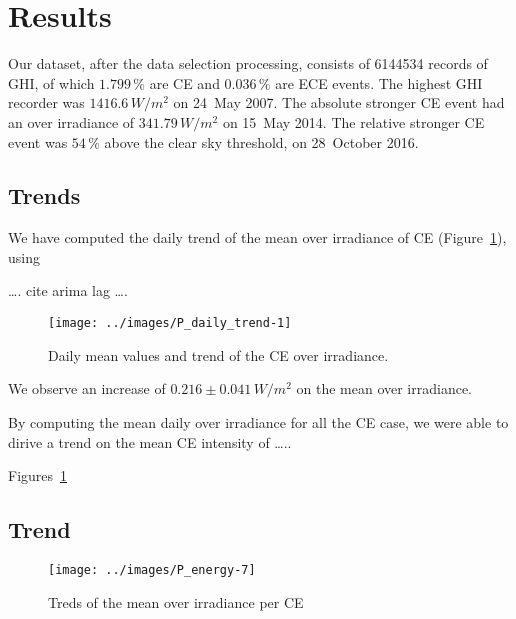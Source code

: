 \documentclass[
]{article}
\begin{document}
\FloatBarrier

\hypertarget{results}{%
\section{Results}\label{results}}

Our dataset, after the data selection processing, consists of
6144534 records of GHI, of which
\(1.799\,\%\) are CE and
\(0.036\,\%\) are ECE events.
The highest GHI recorder was
\(1416.6\,W/m^2\)
on 24~May 2007.
The absolute stronger CE event had an over irradiance of
\(341.79\,W/m^2\) on
15~May 2014.
The relative stronger CE event was
\(54\,\%\) above the
clear sky threshold, on
28~October 2016.

\hypertarget{trends}{%
\subsection{Trends}\label{trends}}

We have computed the daily trend of the mean over irradiance of CE (Figure~\ref{fig:CEmeanDaily}), using

\ldots. cite arima lag \ldots.

\begin{figure}[h!]

{\centering \texttt{[image: ../images/P\_daily\_trend-1]} 

}

\caption{Daily mean values and trend of the CE over irradiance.}\label{fig:CEmeanDaily}
\end{figure}

We observe an increase of
\(0.216\pm 0.041\,W/m^2\)
on the mean over irradiance.

By computing the mean daily over irradiance for all the CE case, we were able to dirive a trend on the mean CE intensity of \ldots..

Figures~\ref{fig:CEmeanDaily}

\hypertarget{trend}{%
\subsection{Trend}\label{trend}}

\begin{figure}[h!]

{\centering \texttt{[image: ../images/P\_energy-7]} 

}

\caption{Treds of the mean over irradiance per CE}\label{fig:unnamed-chunk-1}
\end{figure}
\end{document}
